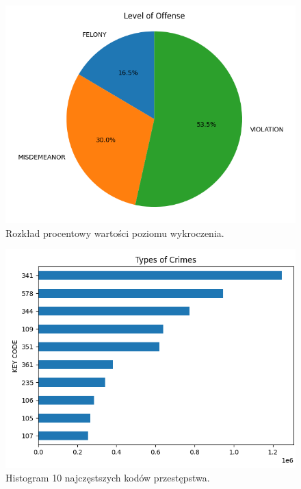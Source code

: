 \documentclass{classrep}
\begin{document}
{{{                \begin{figure}[!htbp]
                    \centering
                    \includegraphics[width=\textwidth]{img/5.1.3/wnioski/offenseLevel.png}
                    \caption{Rozkład procentowy wartości poziomu wykroczenia.}
                    \label{goal_1_results_offenseLevel}
                \end{figure}
                
                \begin{figure}[!htbp]
                    \centering
                    \includegraphics[width=\textwidth]{img/5.1.3/wnioski/typesOfCrimes.png}
                    \caption{Histogram 10 najczęstszych kodów przestępstwa.}
                    \label{goal_1_results_crimesTypes}
                \end{figure}
                \FloatBarrier
                                
}}}
\end{document}
